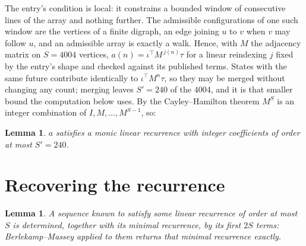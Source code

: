 \documentclass[11pt,a4paper]{article}
\theoremstyle{plain}
\newtheorem{lemma}[theorem]{Lemma}
\theoremstyle{definition}
\begin{document}
The entry's condition is local: it constrains a bounded window of consecutive lines of the
array and nothing further. The admissible configurations of one such window are the vertices
of a finite digraph, an edge joining $u$ to $v$ when $v$ may follow $u$, and an admissible
array is exactly a walk. Hence, with $M$ the adjacency matrix on $S=4004$ vertices,
$a(n)=\iota^{\!\top}M^{\,j(n)}\tau$ for a linear reindexing $j$ fixed by the entry's shape
and checked against its published terms. States with the same future contribute identically to $\iota^{\!\top}M^n\tau$, so they may be merged without changing any count; merging leaves $S'=240$ of the $4004$, and it is that smaller bound the computation below uses. By the Cayley--Hamilton theorem $M^{S}$ is an
integer combination of $I,M,\dots,M^{S-1}$, so:

\begin{lemma}\label{lem:cf}
$a$ satisfies a monic linear recurrence with integer coefficients of order at most
$S'=240$.
\end{lemma}

\section{Recovering the recurrence}

\begin{lemma}\label{lem:bm}
A sequence known to satisfy some linear recurrence of order at most $S$ is determined, together
with its minimal recurrence, by its first $2S$ terms: Berlekamp--Massey applied to them returns
that minimal recurrence exactly.
\end{lemma}
\end{document}
